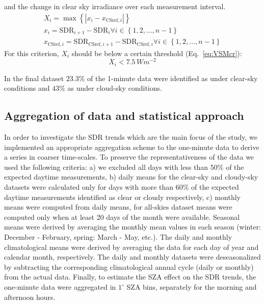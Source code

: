 \documentclass[applsci,article,submit,moreauthors,pdftex]{Definitions/mdpi}
\begin{document}
\begin{enumerate}
  and the change in clear sky irradiance over each measurement interval.
  \begin{gather}
    X_i = \max{\left \{ \left | x_i - x_{\text{CSref},i} \right | \right \}} \label{eq:VSM3} \\
    x_i = \text{SDR}_{i+1} - \text{SDR}_{i} \forall i \in \left \{ 1, 2, \ldots, n-1 \right \} \label{eq:VSM1} \\
    x_{\text{CSref},i} = \text{SDR}_{\text{CSref},i+1} - \text{SDR}_{\text{CSref},i} \forall i \in \left \{ 1, 2, \ldots, n-1 \right \} \label{eq:VSM2}
  \end{gather} For this criterion, \(X_i\) should be below a certain
  threshold (Eq.~\ref{eq:VSMcr}): \begin{equation}
    X_i < 7.5\,Wm^{-2} \label{eq:VSMcr}
  \end{equation}
\end{enumerate}

In the final dataset \(23.3\%\) of the 1-minute data were identified as
under clear-sky conditions and \(43\%\) as under cloud-sky conditions.

\hypertarget{aggregation-of-data-and-statistical-approach}{%
\subsection{Aggregation of data and statistical
approach}\label{aggregation-of-data-and-statistical-approach}}

In order to investigate the SDR trends which are the main focus of the
study, we implemented an appropriate aggregation scheme to the
one-minute data to derive a series in coarser time-scales. To preserve
the representativeness of the data we used the following criteria: a) we
excluded all days with less than 50\% of the expected daytime
measurements, b) daily means for the clear-sky and cloudy-sky datasets
were calculated only for days with more than 60\% of the expected
daytime measurements identified as clear or cloudy respectively, c)
monthly means were computed from daily means, for all-skies dataset
means were computed only when at least 20 days of the month were
available. Seasonal means were derived by averaging the monthly mean
values in each season (winter: December - February, spring: March - May,
etc.). The daily and monthly climatological means were derived by
averaging the data for each day of year and calendar month,
respectively. The daily and monthly datasets were deseasonalized by
subtracting the corresponding climatological annual cycle (daily or
monthly) from the actual data. Finally, to estimate the SZA effect on
the SDR trends, the one-minute data were aggregated in \(1^{\circ}\) SZA
bins, separately for the morning and afternoon hours.
\end{document}
